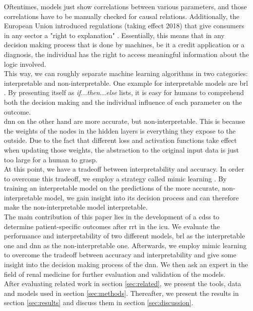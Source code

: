 \documentclass[conference,comsoc]{IEEEtran}
\begin{document}
Oftentimes, models just show correlations between various parameters, and those correlations have to be manually checked for causal relations.
Additionally, the European Union introduced regulations (taking effect 2018) that give consumers in any sector a "right to explanation" \cite{goodman2016european}.
Essentially, this means that in any decision making process that is done by machines, be it a credit application or a diagnosis, the individual has the right to access meaningful information about the logic involved. \\
This way, we can roughly separate machine learning algorithms in two categories: interpretable and non-interpretable. 
One example for interpretable models are \gls{brl} \cite{Letham2015}.
By presenting itself as \emph{if...then...else} lists, it is easy for humans to comprehend both the decision making and the individual influence of each parameter on the outcome. \\
\gls{dnn} on the other hand are more accurate, but non-interpretable.
This is because the weights of the nodes in the hidden layers is everything they expose to the outside.
Due to the fact that different loss and activation functions take effect when updating those weights, the abstraction to the original input data is just too large for a human to grasp. \\
At this point, we have a tradeoff between interpretability and accuracy.
In order to overcome this tradeoff, we employ a strategy called mimic learning \cite{Che2016}.
By training an interpretable model on the predictions of the more accurate, non-interpretable model, we gain insight into its decision process and can therefore make the non-interpretable model interpretable. \\
The main contribution of this paper lies in the development of a \gls{cdss} to determine patient-specific outcomes after \gls{rrt} in the \gls{icu}.
We evaluate the performance and interpretability of two different models, \gls{brl} as the interpretable one and \gls{dnn} as the non-interpretable one.
Afterwards, we employ mimic learning to overcome the tradeoff between accuracy and interpretability and give some insight into the decision making process of the \gls{dnn}.
We then ask an expert in the field of renal medicine for further evaluation and validation of the models. \\
After evaluating related work in section \ref{sec:related}, we present the tools, data and models used in section \ref{sec:methods}.
Thereafter, we present the results in section \ref{sec:results} and discuss them in section \ref{sec:discussion}.
\end{document}
